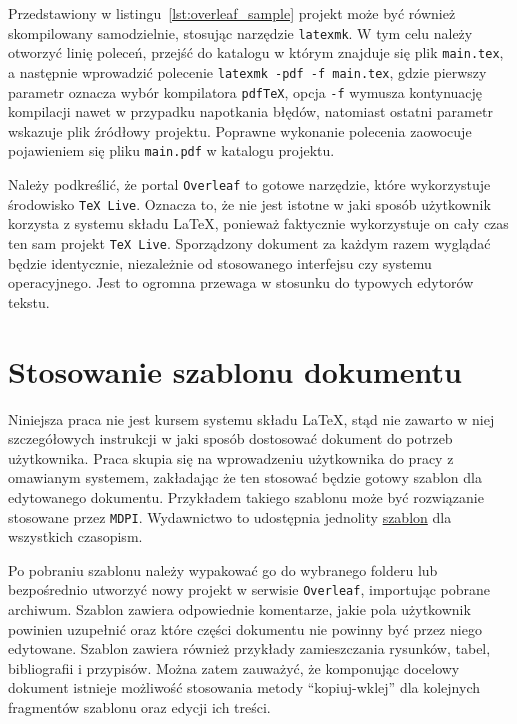 Przedstawiony w listingu~\ref{lst:overleaf_sample} projekt może być również skompilowany samodzielnie, stosując narzędzie \texttt{latexmk}. W tym celu należy otworzyć linię poleceń, przejść do katalogu w którym znajduje się plik \texttt{main.tex}, a następnie wprowadzić polecenie \texttt{latexmk -pdf -f main.tex}, gdzie pierwszy parametr oznacza wybór kompilatora \texttt{pdfTeX}, opcja \texttt{-f} wymusza kontynuację kompilacji nawet w przypadku napotkania błędów, natomiast ostatni parametr wskazuje plik źródłowy projektu. Poprawne wykonanie polecenia zaowocuje pojawieniem się pliku \texttt{main.pdf} w katalogu projektu.

Należy podkreślić, że portal \texttt{Overleaf} to gotowe narzędzie, które wykorzystuje środowisko \texttt{TeX Live}. Oznacza to, że nie jest istotne w jaki sposób użytkownik korzysta z systemu składu \LaTeX{}, ponieważ faktycznie wykorzystuje on cały czas ten sam projekt \texttt{TeX Live}. Sporządzony dokument za każdym razem wyglądać będzie identycznie, niezależnie od stosowanego interfejsu czy systemu operacyjnego. Jest to ogromna przewaga w stosunku do typowych edytorów tekstu.

\section{Stosowanie szablonu dokumentu}

Niniejsza praca nie jest kursem systemu składu \LaTeX{}, stąd nie zawarto w niej szczegółowych instrukcji w jaki sposób dostosować dokument do potrzeb użytkownika. Praca skupia się na wprowadzeniu użytkownika do pracy z omawianym systemem, zakładając że ten stosować będzie gotowy szablon dla edytowanego dokumentu. Przykładem takiego szablonu może być rozwiązanie stosowane przez \texttt{MDPI}. Wydawnictwo to udostępnia jednolity \href{https://www.mdpi.com/authors/latex}{szablon} dla wszystkich czasopism.

Po pobraniu szablonu należy wypakować go do wybranego folderu lub bezpośrednio utworzyć nowy projekt w serwisie \texttt{Overleaf}, importując pobrane archiwum. Szablon zawiera odpowiednie komentarze, jakie pola użytkownik powinien uzupełnić oraz które części dokumentu nie powinny być przez niego edytowane. Szablon zawiera również przykłady zamieszczania rysunków, tabel, bibliografii i przypisów. Można zatem zauważyć, że komponując docelowy dokument istnieje możliwość stosowania metody \enquote{kopiuj-wklej} dla kolejnych fragmentów szablonu oraz edycji ich treści.


